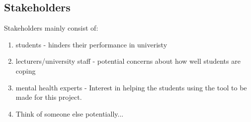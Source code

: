 



\subsection{Stakeholders}

Stakeholders mainly consist of: 

\begin{enumerate}
    \item students - hinders their performance in univeristy
    \item lecturers/university staff - potential concerns about how well students are coping
    \item mental health experts - Interest in helping the students using the tool to be made for this project.
    \item Think of someone else potentially...  
\end{enumerate}